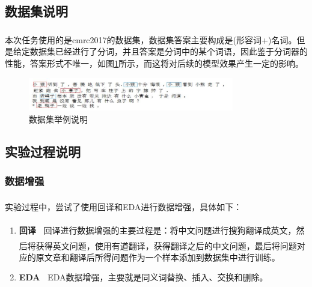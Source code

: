 \documentclass[10pt, a4]{extarticle}
\newcommand{\upcite}[1]{\textsuperscript{\textsuperscript{\cite{#1}}}}
\begin{document}
\subsection{数据集说明}
本次任务使用的是cmrc2017\upcite{cmrc}的数据集，数据集答案主要构成是(形容词+)名词。但是给定数据集已经进行了分词，并且答案是分词中的某个词语，因此鉴于分词器的性能，答案形式不唯一，如图\ref{dataset}所示，而这将对后续的模型效果产生一定的影响。
\begin{figure}[H]
	\centering
	\includegraphics[width=0.8\textwidth]{figure/dataset.jpg}
	\caption{数据集举例说明}
	\label{dataset}
\end{figure}

\subsection{实验过程说明}
\subsubsection{数据增强}
实验过程中，尝试了使用回译和EDA\upcite{eda}进行数据增强，具体如下：
\begin{enumerate}
	\item \textbf{回译\ } 回译进行数据增强的主要过程是：将中文问题进行搜狗翻译\upcite{sogou}成英文，然后将获得英文问题，使用有道翻译\upcite{youdao}，获得翻译之后的中文问题，最后将问题对应的原文章和翻译后所得问题作为一个样本添加到数据集中进行训练。
	\item \textbf{EDA\ } EDA数据增强，主要就是同义词替换、插入、交换和删除。
\end{enumerate}
\end{document}
